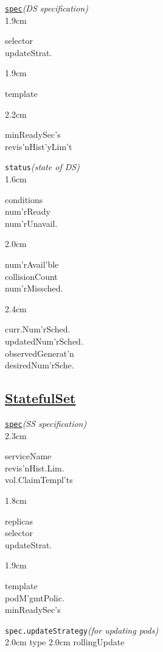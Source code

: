 \texttt{\href{https://kubernetes.io/docs/reference/kubernetes-api/workload-resources/daemon-set-v1/}{spec}}\quad\textit{(DS specification)}\\[-2mm]
\api
{1.9cm}{
selector        \\
updateStrat.    

}
{1.9cm}{
template        

}
{2.2cm}{
minReadySec's       \\
revis'nHist'yLim't  

}
\stopapi


\texttt{status}\quad\textit{(state of DS)}\\[-2mm]
\api
{1.6cm}{
conditions          \\
num'rReady          \\
num'rUnavail.       

}
{2.0cm}{
num'rAvail'ble      \\
collisionCount      \\
num'rMissched.      

}
{2.4cm}{
curr.Num'rSched.    \\
updatedNum'rSched.  \\
observedGenerat'n  \\
desiredNum'rSche.  

}
\stopapi




\subsection*{\href{https://kubernetes.io/docs/concepts/workloads/controllers/statefulset/}{StatefulSet}}

\texttt{\href{https://kubernetes.io/docs/reference/kubernetes-api/workload-resources/stateful-set-v1/}{spec}}\quad\textit{(SS specification)}\\[-2mm]
\api
{2.3cm}{
serviceName     \\
revis'nHist.Lim.\\
vol.ClaimTempl'ts

}
{1.8cm}{
replicas        \\
selector        \\
updateStrat.    

}
{1.9cm}{
template        \\
podM'gmtPolic.  \\
minReadySec's   

}
\stopapi

\texttt{spec.updateStrategy}\quad\textit{(for updating pods)}\\[-2mm]
\api
{2.0cm}{
type
}
{2.0cm}{
rollingUpdate
}
\stopapi


